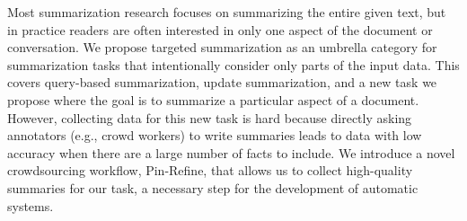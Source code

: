Most summarization research focuses on summarizing the entire given text, but in practice readers are often interested in only one aspect of the document or conversation. We propose targeted summarization as an umbrella category for summarization tasks that intentionally consider only parts of the input data. This covers query-based summarization, update summarization, and a new task we propose where the goal is to summarize a particular aspect of a document. However, collecting data for this new task is hard because directly asking annotators (e.g., crowd workers) to write summaries leads to data with low accuracy when there are a large number of facts to include. We introduce a novel crowdsourcing workflow, Pin-Refine, that allows us to collect high-quality summaries for our task, a necessary step for the development of automatic systems.
